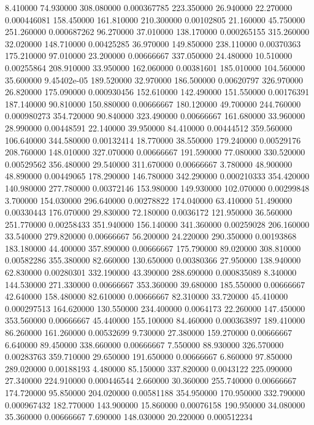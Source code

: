 8.410000	74.930000	308.080000	0.000367785
223.350000	26.940000	22.270000	0.000446081
158.450000	161.810000	210.300000	0.00102805
21.160000	45.750000	251.260000	0.000687262
96.270000	37.010000	138.170000	0.000265155
315.260000	32.020000	148.710000	0.00425285
36.970000	149.850000	238.110000	0.00370363
175.210000	97.010000	23.200000	0.00666667
337.050000	24.480000	10.510000	0.00255864
208.910000	33.950000	162.060000	0.00381601
185.010000	104.560000	35.600000	9.45402e-05
189.520000	32.970000	186.500000	0.00620797
326.970000	26.820000	175.090000	0.000930456
152.610000	142.490000	151.550000	0.00176391
187.140000	90.810000	150.880000	0.00666667
180.120000	49.700000	244.760000	0.000980273
354.720000	90.840000	323.490000	0.00666667
161.680000	33.960000	28.990000	0.00448591
22.140000	39.950000	84.410000	0.00444512
359.560000	106.640000	344.580000	0.00132414
18.770000	38.550000	179.240000	0.00529176
208.760000	148.010000	327.070000	0.00666667
191.590000	77.080000	330.520000	0.00529562
356.480000	29.540000	311.670000	0.00666667
3.780000	48.900000	48.890000	0.00449065
178.290000	146.780000	342.290000	0.000210333
354.420000	140.980000	277.780000	0.00372146
153.980000	149.930000	102.070000	0.00299848
3.700000	154.030000	296.640000	0.00278822
174.040000	63.410000	51.490000	0.00330443
176.070000	29.830000	72.180000	0.0036172
121.950000	36.560000	251.770000	0.00258433
351.940000	156.140000	341.360000	0.00259028
206.160000	33.540000	279.820000	0.00666667
56.200000	24.220000	290.350000	0.00193868
183.180000	44.400000	357.890000	0.00666667
175.790000	89.020000	308.810000	0.00582286
355.380000	82.660000	130.650000	0.00380366
27.950000	138.940000	62.830000	0.00280301
332.190000	43.390000	288.690000	0.000835089
8.340000	144.530000	271.330000	0.00666667
353.360000	39.680000	185.550000	0.00666667
42.640000	158.480000	82.610000	0.00666667
82.310000	33.720000	45.410000	0.000297513
164.620000	130.550000	234.400000	0.0064173
22.260000	147.450000	353.560000	0.00666667
45.440000	155.100000	84.460000	0.000363897
189.410000	86.260000	161.260000	0.00532699
9.730000	27.380000	159.270000	0.00666667
6.640000	89.450000	338.660000	0.00666667
7.550000	88.930000	326.570000	0.00283763
359.710000	29.650000	191.650000	0.00666667
6.860000	97.850000	289.020000	0.00188193
4.480000	85.150000	337.820000	0.0043122
225.090000	27.340000	224.910000	0.000446544
2.660000	30.360000	255.740000	0.00666667
174.720000	95.850000	204.020000	0.00581188
354.950000	170.950000	332.790000	0.000967432
182.770000	143.900000	15.860000	0.00076158
190.950000	34.080000	35.360000	0.00666667
7.690000	148.030000	20.220000	0.000512234

